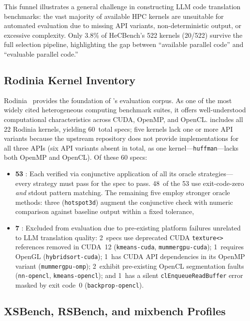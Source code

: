 This funnel illustrates a general challenge in constructing LLM code translation
benchmarks: the vast majority of available HPC kernels are unsuitable for
automated evaluation due to missing API variants, non-deterministic output, or
excessive complexity. Only 3.8\% of HeCBench's 522 kernels (20/522) survive the
full selection pipeline, highlighting the gap between ``available parallel code''
and ``evaluable parallel code.''

\subsection{Rodinia Kernel Inventory}
\label{sec:appendix-c4}

Rodinia~\cite{Rodinia2009} provides the foundation of \parbench{}'s evaluation corpus. As one of the most widely cited heterogeneous computing benchmark suites, it offers well-understood computational characteristics across CUDA, OpenMP, and OpenCL. \parbench{} includes all 22 Rodinia kernels, yielding 60~total specs; five kernels lack one or more API variants because the upstream repository does not provide implementations for all three APIs (six API variants absent in total, as one kernel---\texttt{huffman}---lacks both OpenMP and OpenCL). Of these 60 specs:

\begin{itemize}
    \item \textbf{53 \pass{}}: Each verified via conjunctive application of all its oracle strategies---every strategy must pass for the spec to pass. 48~of the 53 use exit-code-zero \emph{and} stdout pattern matching. The remaining five employ stronger oracle methods: three (\texttt{hotspot3d}) augment the conjunctive check with numeric comparison against baseline output within a fixed tolerance,
    \item \textbf{7 \knownfail{}}: Excluded from evaluation due to pre-existing platform failures unrelated to LLM translation quality:
    2~specs use deprecated CUDA \texttt{texture<>} references removed in CUDA~12 (\texttt{kmeans-cuda}, \texttt{mummergpu-cuda});
    1~requires OpenGL (\texttt{hybridsort-cuda});
    1~has CUDA API dependencies in its OpenMP variant (\texttt{mummergpu-omp});
    2~exhibit pre-existing OpenCL segmentation faults (\texttt{nn-opencl}, \texttt{kmeans-opencl}); and
    1~has a silent \texttt{clEnqueueReadBuffer} error masked by exit code~0 (\texttt{backprop-opencl}).
\end{itemize}

\subsection{XSBench, RSBench, and mixbench Profiles}
\label{sec:appendix-c5}

